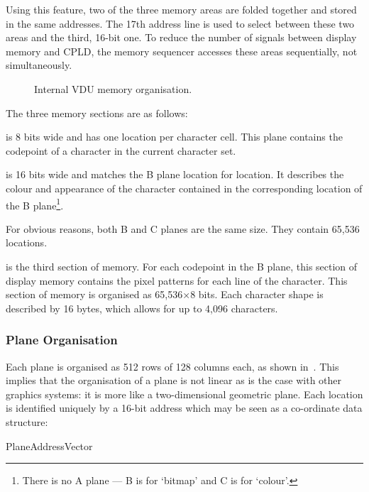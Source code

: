 Using this feature, two of the three memory areas are folded together and
stored in the same addresses. The 17th address line is used to select between
these two areas and the third, 16-bit one. To reduce the number of signals
between display memory and CPLD, the memory sequencer accesses these areas
sequentially, not simultaneously.

\begin{figure}
 \centering
 
 \caption[VDU Memory Map]{\label{fig:vdu-memory-map} Internal VDU memory organisation.}
\end{figure}

The three memory sections are as follows:

\begin{description}
   is 8 bits wide and has one location per character cell. This plane
  contains the \gls{codepoint} of a character in the current character set.

   is 16 bits wide and matches the B plane location for location. It
  describes the colour and appearance of the character contained in the
  corresponding location of the B plane\footnote{There is no A plane — B is for
    ‘bitmap’ and C is for ‘colour’.}.

  For obvious reasons, both B and C planes are the same size. They contain 65,536
  locations.

   is the third section of memory. For each
  codepoint in the B plane, this section of display memory contains the pixel
  patterns for each line of the character. This section of memory is organised as
  65,536×8 bits. Each character shape is described by 16 bytes, which allows for
  up to 4,096 characters.
\end{description}


\subsubsection{Plane Organisation}

Each plane is organised as 512 rows of 128 columns each, as shown
in~. This implies that the organisation of a plane is not
linear as is the case with other graphics systems: it is more like a
two-dimensional geometric plane. Each location is identified uniquely by a
16-bit address which may be seen as a co-ordinate data structure:


\begin{datastructure}[Bits]{PlaneAddressVector}
\end{datastructure}

